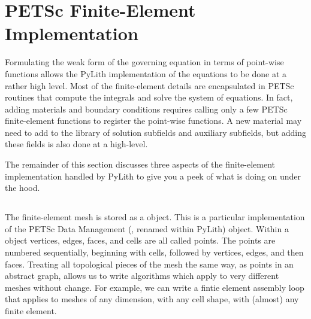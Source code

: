 \section{PETSc Finite-Element Implementation}

Formulating the weak form of the governing equation in terms of
point-wise functions allows the PyLith implementation of the equations
to be done at a rather high level. Most of the finite-element details
are encapsulated in PETSc routines that compute the integrals and
solve the system of equations. In fact, adding materials and boundary
conditions requires calling only a few PETSc finite-element functions
to register the point-wise functions. A new material may need to add
to the library of solution subfields and auxiliary subfields, but
adding these fields is also done at a high-level.

The remainder of this section discusses three aspects of the
finite-element implementation handled by PyLith to give you a peek of
what is doing on under the hood.



\subsection{}

The finite-element mesh is stored as a  object. This is
a particular implementation of the PETSc Data Management (,
renamed  within PyLith) object. Within a
 object vertices, edges, faces, and cells are all
called points. The points are numbered sequentially, beginning with
cells, followed by vertices, edges, and then faces. Treating all
topological pieces of the mesh the same way, as points in an abstract
graph, allows us to write algorithms which apply to very different
meshes without change. For example, we can write a fintie element
assembly loop that applies to meshes of any dimension, with any cell
shape, with (almost) any finite element.

